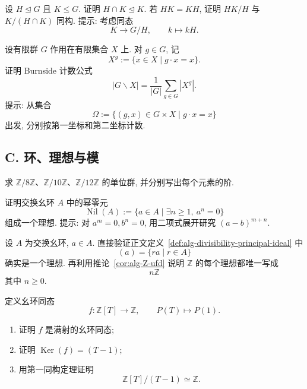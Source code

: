 \documentclass[usesamecnt, thmcnt=section, lang=cn, newtx, 10pt, scheme=chinese]{elegantbook}
\begin{document}
\begin{exercise}\label{ex:alg-end-09}
设 $H\trianglelefteq G$ 且 $K\leq G$. 证明 $H\cap K\trianglelefteq K$. 若 $HK=KH$, 证明 $HK/H$ 与 $K/(H\cap K)$ 同构. 提示: 考虑同态
\[
 K\longrightarrow G/H,
 \qquad k\longmapsto kH.
\]
\end{exercise}

\begin{challenge}\label{ch:alg-01}
设有限群 $G$ 作用在有限集合 $X$ 上. 对 $g\in G$, 记
\[
 X^g:=\{x\in X\mid g\cdot x=x\}.
\]
证明 Burnside 计数公式
\[
 |G\backslash X|
 =\frac1{|G|}\sum_{g\in G}|X^g|.
\]
提示: 从集合
\[
 \Omega:=\{(g,x)\in G\times X\mid g\cdot x=x\}
\]
出发, 分别按第一坐标和第二坐标计数.
\end{challenge}

\subsection*{C. 环、理想与模}

\begin{exercise}\label{ex:alg-end-10}
求 $\mathbb Z/8\mathbb Z$、$\mathbb Z/10\mathbb Z$、$\mathbb Z/12\mathbb Z$ 的单位群, 并分别写出每个元素的阶.
\end{exercise}

\begin{exercise}\label{ex:alg-end-11}
证明交换幺环 $A$ 中的幂零元
\[
 \operatorname{Nil}(A):=\{a\in A\mid \exists n\geq1,\ a^n=0\}
\]
组成一个理想. 提示: 对 $a^m=0,b^n=0$, 用二项式展开研究 $(a-b)^{m+n}$.
\end{exercise}

\begin{exercise}\label{ex:alg-end-12}
设 $A$ 为交换幺环, $a\in A$. 直接验证正文定义~\ref{def:alg-divisibility-principal-ideal} 中
\[
 (a)=\{ra\mid r\in A\}
\]
确实是一个理想. 再利用推论~\ref{cor:alg-Z-ufd} 说明 $\mathbb Z$ 的每个理想都唯一写成
\[
 n\mathbb Z
\]
其中 $n\geq0$.
\end{exercise}

\begin{exercise}\label{ex:alg-end-13}
定义幺环同态
\[
 f:\mathbb Z[T]\longrightarrow\mathbb Z,
 \qquad
 P(T)\longmapsto P(1).
\]
\begin{enumerate}[label=\rm(\arabic*)]
  \item 证明 $f$ 是满射的幺环同态;
  \item 证明 $\operatorname{Ker}(f)=(T-1)$;
  \item 用第一同构定理证明
  \[
   \mathbb Z[T]/(T-1)\simeq\mathbb Z.
  \]
\end{enumerate}
\end{exercise}
\end{document}
